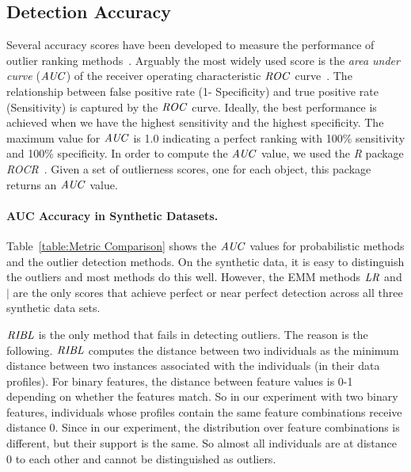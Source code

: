 {\subsection{Detection Accuracy} \label{sec:detection} Several accuracy scores have been developed to measure the performance of outlier ranking methods~\citet{aggarwal2013}. Arguably the most widely used score is the {\em area under curve} ($\it{AUC}$) of the receiver operating characteristic $\it{ROC}$ curve~\citep{Fawcett2006,Cansado2008,Muller2012}. 
		The relationship between false positive rate (1- Specificity) and true positive rate (Sensitivity) is captured by the $\it{ROC}$ curve. Ideally, the best performance is achieved when we have the highest sensitivity and the highest specificity. 
		The maximum value for $\it{AUC}$ is 1.0 indicating a perfect ranking with 100\% sensitivity and 100\% specificity. In order to compute the $\it{AUC}$ value, we used the \textit{R} package \textit{ROCR}~\citep{RROCR2012}. Given a set of outlierness scores, one for each object, this package returns an $\it{AUC}$ value. 



	\paragraph{AUC Accuracy in Synthetic Datasets.}
	Table~\ref{table:Metric Comparison} shows the $\it{AUC}$ values for probabilistic methods and the outlier detection methods. On the synthetic data, it is easy to distinguish the outliers and most methods do this well. However, the EMM methods $\it{LR}$ and $\mid$ are the only scores that achieve perfect or near perfect detection across all three synthetic data sets. 
	
	$\it{RIBL}$ is the only method that fails in detecting outliers. The reason is the following. $\it{RIBL}$ computes the distance between two individuals as the minimum distance between two instances associated with the individuals (in their data profiles). For binary features, the distance between feature values is 0-1 depending on whether the features match. So in our experiment with two binary features, individuals whose profiles contain the same feature combinations receive distance 0. Since in our experiment, the distribution over feature combinations is different, but their support is the same. So almost all individuals are at distance 0 to each other and cannot be distinguished as outliers. 
	
}
